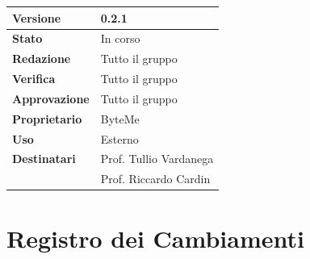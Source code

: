 \documentclass[11pt,a4paper]{article}
\begin{document}
\begin{titlepage}
    \begin{table}[H]
        \centering
        \begin{tabular}{|l|p{5cm}|}
            \hline
            \textbf{Versione} & 0.2.1 \\
            \hline
            \textbf{Stato} & In corso \\
            \hline
            \textbf{Redazione} & Tutto il gruppo \\
            \hline
            \textbf{Verifica} & Tutto il gruppo \\
            \hline
            \textbf{Approvazione} & Tutto il gruppo \\
            \hline
            \textbf{Proprietario} & ByteMe \\
            \hline
            \textbf{Uso} & Esterno \\
            \hline
            \textbf{Destinatari} & Prof. Tullio Vardanega \\ & Prof. Riccardo Cardin \\
            \hline
        \end{tabular}
    \end{table}
    
    \vfill
\end{titlepage}

\section*{Registro dei Cambiamenti}
\end{document}
